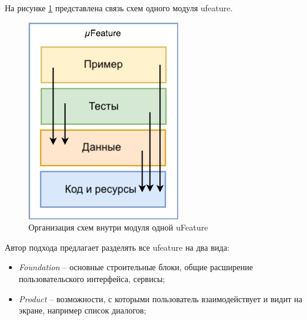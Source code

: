 На рисунке \ref{sec:analysis:research:mobArch:ufeature:featureDependencyDiagram} представлена связь схем одного модуля \gls{ufeature}.

\begin{figure}[h]
  \centering
    \includegraphics{inc/img/ufeature-diagram.png}
  \caption{Организация схем внутри модуля одной uFeature}
  \label{sec:analysis:research:mobArch:ufeature:featureDependencyDiagram}
\end{figure}

Автор подхода предлагает разделять все \gls{ufeature} на два вида:

\begin{itemize}
	\item \emph{Foundation} -- основные строительные блоки, общие расширение пользовательского интерфейса, сервисы;
	\item \emph{Product} -- возможности, с которыми пользователь взаимодействует и видит на экране, например список диалогов;
\end{itemize}

